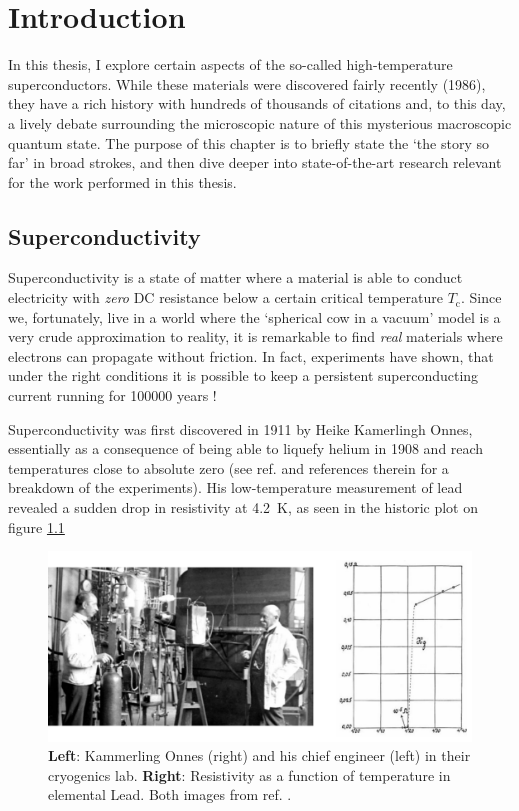 \chapter{Introduction}\label{ch:intro}

In this thesis, I explore certain aspects of the so-called high-temperature superconductors. While these materials were discovered fairly recently (1986), they have a rich history with hundreds of thousands of citations and, to this day, a lively debate surrounding the microscopic nature of this mysterious macroscopic quantum state. The purpose of this chapter is to briefly state the `the story so far' in broad strokes, and then dive deeper into state-of-the-art research relevant for the work performed in this thesis.

\section{Superconductivity}
Superconductivity is a state of matter where a material is able to conduct electricity with \emph{zero} DC resistance below a certain critical temperature $T_\text{c}$. Since we, fortunately, live in a world where the `spherical cow in a vacuum' model is a very crude approximation to reality, it is remarkable to find \emph{real} materials where electrons can propagate without friction. In fact, experiments have shown, that under the right conditions it is possible to keep a persistent superconducting current running for 100000 years \cite{File1963}!

Superconductivity was first discovered in 1911 by Heike Kamerlingh Onnes, essentially as a consequence of being able to liquefy helium in 1908 and reach temperatures close to absolute zero (see ref. \cite{VanDelft2010} and references therein for a breakdown of the experiments). His low-temperature measurement of lead revealed a sudden drop in resistivity at \SI{4.2}{\kelvin}, as seen in the historic plot on figure \ref{fig:onnes}

\begin{figure}
    \centering
    \includegraphics[width=\textwidth]{fig/intro/onnes.png}
    \caption[SC of elemental lead]{\textbf{Left}: Kammerling Onnes (right) and his chief engineer (left) in their cryogenics lab. \textbf{Right}: Resistivity as a function of temperature in elemental Lead. Both images from ref. \cite{VanDelft2010}.}
    \label{fig:onnes}
\end{figure}

